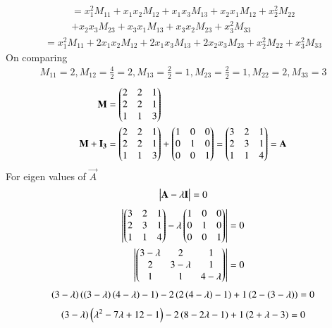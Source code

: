 \documentclass[journal]{IEEEtran}
\begin{document}
            \begin{align}
            =x_1^2 M_{11} + x_1 x_2 M_{12} + x_1 x_3 M_{13} + x_2 x_1 M_{12} + x_2^2 M_{22} \\ \nonumber+ x_2 x_3 M_{23} + x_3 x_1 M_{13} + x_3 x_2 M_{23} + x_3^2 M_{33}
            \end{align}
            \begin{align}
           =x_1^2 M_{11} + 2x_1 x_2 M_{12} + 2x_1 x_3 M_{13}+2x_2 x_3 M_{23} + x_2^2 M_{22}+x_3^2 M_{33}
            \end{align}
On comparing
\begin{align}
    M_{11}=2,M_{12}=\frac{4}{2}=2,M_{13}=\frac{2}{2}=1,M_{23}=\frac{2}{2}=1,M_{22}=2,M_{33}=3 
\end{align}
\begin{align}
    \mathbf{M}&=\begin{pmatrix}2&2&1\\2&2&1\\1&1&3\end{pmatrix}\\
    \mathbf{M}+\mathbf{I_3}&=\begin{pmatrix}2&2&1\\2&2&1\\1&1&3\end{pmatrix}+\begin{pmatrix}1&0&0\\0&1&0\\0&0&1\end{pmatrix}=\begin{pmatrix}3&2&1\\2&3&1\\1&1&4\end{pmatrix}=\mathbf{A}
\end{align}
For eigen values of $\vec{A}$
\begin{align}
    \begin{vmatrix}\mathbf{A}-\lambda\mathbf{I}\end{vmatrix}=0 
    \end{align}
    \begin{align}
    \begin{vmatrix}\begin{pmatrix}3&2&1\\2&3&1\\1&1&4\end{pmatrix}-\lambda\begin{pmatrix}1&0&0\\0&1&0\\0&0&1\end{pmatrix}\end{vmatrix} = 0 \\
 \begin{vmatrix}\begin{pmatrix}3-\lambda&2&1\\2&3-\lambda&1\\1&1&4-\lambda\end{pmatrix}\end{vmatrix}=0 
 \end{align}
 \begin{align}
 \left(3-\lambda\right)\left(\left(3-\lambda\right)\left(4-\lambda\right)-1\right)-2\left(2\left(4-\lambda\right)-1\right)+1\left(2-\left(3-\lambda\right)\right)=0 
 \end{align}
 \vspace{-0.7cm} 
 \begin{align}
 \left(3-\lambda\right)\left(\lambda^2-7\lambda+12-1\right)-2\left(8-2\lambda-1\right)+1\left(2+\lambda-3\right)=0 
 \end{align}
\end{document}
